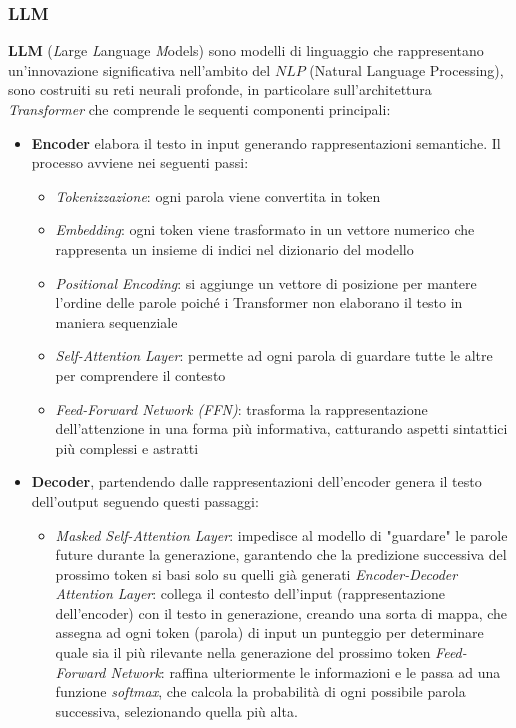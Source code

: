\documentclass{article}
\begin{document}
\subsubsection{LLM} 
\textbf{LLM} (\textit{L}arge \textit{L}anguage \textit{M}odels) sono modelli di linguaggio che rappresentano un'innovazione significativa nell'ambito del \(NLP\) (Natural Language Processing), sono costruiti su reti neurali profonde\cite{di2025use}, in particolare sull'architettura \textit{Transformer}\cite{vaswani2017attention} che comprende le sequenti componenti principali:
\begin{itemize}
\item \textbf{Encoder} elabora il testo in input generando rappresentazioni semantiche. Il processo avviene nei seguenti passi:
\begin{itemize}
    \item \textit{Tokenizzazione}: ogni parola viene convertita in token \cite{huggingface_transformers_tokenizer}
    \item \textit{Embedding}: ogni token viene trasformato in un vettore numerico che rappresenta un insieme di indici nel dizionario del modello \cite{devlin2019bertpretrainingdeepbidirectional}
    \item \textit{Positional Encoding}: si aggiunge un vettore di posizione per mantere l'ordine delle parole poiché i Transformer non elaborano il testo in maniera sequenziale \cite{vaswani2017attention}
    \item \textit{Self-Attention Layer}: permette ad ogni parola di guardare tutte le altre per comprendere il contesto \cite{vaswani2017attention}
    \item \textit{Feed-Forward Network (FFN)}: trasforma la rappresentazione dell'attenzione in una forma più informativa, catturando aspetti sintattici più complessi e astratti \cite{vaswani2017attention}
\end{itemize}
\item \textbf{Decoder}, partendendo dalle rappresentazioni dell'encoder genera il testo dell'output seguendo questi passaggi:
\begin{itemize}
    \item \textit{Masked Self-Attention Layer}: impedisce al modello di "guardare" le parole future durante la generazione, garantendo che la predizione successiva del prossimo token si basi solo su quelli già generati
    \textit{Encoder-Decoder Attention Layer}: collega il contesto dell’input (rappresentazione dell'encoder) con il testo in generazione, creando una sorta di mappa, che assegna ad ogni token (parola) di input un punteggio per determinare quale sia il più rilevante nella generazione del prossimo token
    \textit{Feed-Forward Network}: raffina ulteriormente le informazioni e le passa ad una funzione \textit{softmax}, che calcola la probabilità di ogni possibile parola successiva, selezionando quella più alta.
    \cite{vaswani2017attention}
\end{itemize}


\end{itemize}
\end{document}
